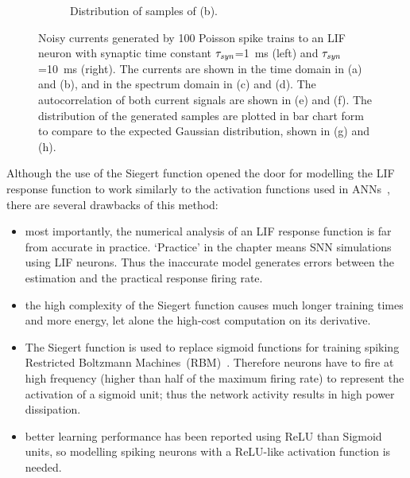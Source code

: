 \begin{figure}[tbp!]
\begin{subfigure}[t]{0.43\textwidth}
			\caption{Distribution of samples of (b).}
		\end{subfigure}
		\caption[Noisy currents generated by Poisson spike trains.]{Noisy currents generated by 100 Poisson spike trains to an LIF neuron with synaptic time constant $\tau_{\textit{\textrm{syn}}}$=1~ms (left) and $\tau_{\textit{\textrm{syn}}}$=10~ms (right). The currents are shown in the time domain in (a) and (b), and in the spectrum domain in (c) and (d). The autocorrelation of both current signals are shown in (e) and (f). The distribution of the generated samples are plotted in bar chart form to compare to the expected Gaussian distribution, shown in (g) and (h).}
		\label{Fig:lif_pois}
	\end{figure}

	
	
	
		Although the use of the Siegert function opened the door for modelling the LIF response function to work similarly to the activation functions used in ANNs~\citep{Jug_etal_2012}, there are several drawbacks of this method:
	\begin{itemize}
		\item most importantly, the numerical analysis of an LIF response function is far from accurate in practice. `Practice' in the chapter means SNN simulations using LIF neurons.
		Thus the inaccurate model generates errors between the estimation and the practical response firing rate.
		
		
		\item the high complexity of the Siegert function causes much longer training times and more energy, let alone the high-cost computation on its derivative.
		\item The Siegert function is used to replace sigmoid functions for training spiking Restricted Boltzmann Machines~(RBM)~\citep{Jug_etal_2012}.
		Therefore neurons have to fire at high frequency (higher than half of the maximum firing rate) to represent the activation of a sigmoid unit; thus the network activity results in high power dissipation.
		\item better learning performance has been reported using ReLU than Sigmoid units, so modelling spiking neurons with a ReLU-like activation function is needed.  
	\end{itemize}
	
